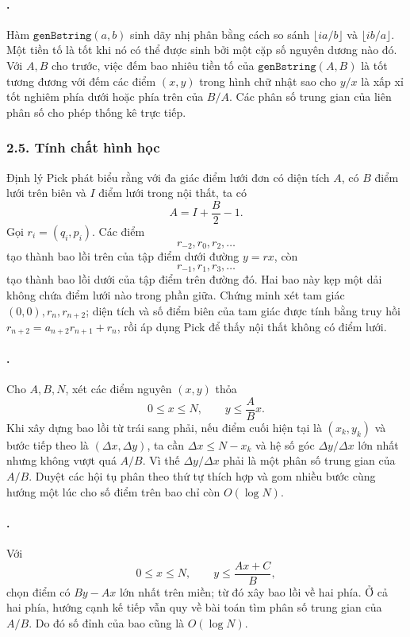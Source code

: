 \documentclass[11pt]{article}
\begin{document}
\paragraph{.}
Hàm \(\texttt{genBstring}(a,b)\) sinh dãy nhị phân bằng cách so sánh
\(\lfloor ia/b\rfloor\) và \(\lfloor ib/a\rfloor\). Một tiền tố là tốt khi
nó có thể được sinh bởi một cặp số nguyên dương nào đó. Với \(A,B\) cho trước,
việc đếm bao nhiêu tiền tố của \(\texttt{genBstring}(A,B)\) là tốt tương đương
với đếm các điểm \((x,y)\) trong hình chữ nhật sao cho \(y/x\) là xấp xỉ tốt
nghiêm phía dưới hoặc phía trên của \(B/A\). Các phân số trung gian của liên
phân số cho phép thống kê trực tiếp.

\subsubsection*{2.5. Tính chất hình học}

Định lý Pick phát biểu rằng với đa giác điểm lưới đơn có diện tích \(A\), có
\(B\) điểm lưới trên biên và \(I\) điểm lưới trong nội thất, ta có
\[
  A=I+\frac{B}{2}-1.
\]
Gọi \(r_i=(q_i,p_i)\). Các điểm
\[
  r_{-2},r_0,r_2,\ldots
\]
tạo thành bao lồi trên của tập điểm dưới đường \(y=rx\), còn
\[
  r_{-1},r_1,r_3,\ldots
\]
tạo thành bao lồi dưới của tập điểm trên đường đó. Hai bao này kẹp một dải
không chứa điểm lưới nào trong phần giữa. Chứng minh xét tam giác
\((0,0), r_n, r_{n+2}\); diện tích và số điểm biên của tam giác được tính bằng
truy hồi \(r_{n+2}=a_{n+2}r_{n+1}+r_n\), rồi áp dụng Pick để thấy nội thất
không có điểm lưới.


\paragraph{.}
Cho \(A,B,N\), xét các điểm nguyên \((x,y)\) thỏa
\[
  0\le x\le N,\qquad y\le \frac ABx.
\]
Khi xây dựng bao lồi từ trái sang phải, nếu điểm cuối hiện tại là
\((x_k,y_k)\) và bước tiếp theo là \((\Delta x,\Delta y)\), ta cần
\(\Delta x\le N-x_k\) và hệ số góc \(\Delta y/\Delta x\) lớn nhất nhưng không
vượt quá \(A/B\). Vì thế \(\Delta y/\Delta x\) phải là một phân số trung gian
của \(A/B\). Duyệt các hội tụ phân theo thứ tự thích hợp và gom nhiều bước
cùng hướng một lúc cho số điểm trên bao chỉ còn \(O(\log N)\).

\paragraph{.}
Với
\[
  0\le x\le N,\qquad y\le \frac{Ax+C}{B},
\]
chọn điểm có \(By-Ax\) lớn nhất trên miền; từ đó xây bao lồi về hai phía.
Ở cả hai phía, hướng cạnh kế tiếp vẫn quy về bài toán tìm phân số trung gian
của \(A/B\). Do đó số đỉnh của bao cũng là \(O(\log N)\).
\end{document}
